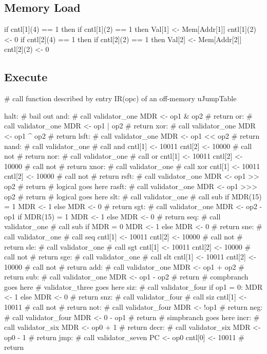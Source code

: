 \documentclass[12pt]{article}
\begin{document}
\subsection{Memory Load}
\begin{verbatimtab}
if cntl[1](4) == 1 then
    if cntl[1](2) == 1 then
        Val[1] <- Mem[Addr[1]]
        cntl[1](2) <- 0
if cntl[2](4) == 1 then
    if cntl[2](2) == 1 then
        Val[2] <- Mem[Addr[2]]
        cntl[2](2) <- 0
\end{verbatimtab}

\subsection{Execute}
\begin{verbatimtab}
# call function described by entry IR(opc) of an off-memory uJumpTable

halt:
# bail out
and:
    # call validator_one
    MDR <- op1 & op2
    # return
or:
    # call validator_one
    MDR <- op1 | op2
    # return
xor:
    # call validator_one
    MDR <- op1 ^ op2
    # return
lsft:
    # call validator_one
    MDR <- op1 << op2
    # return
nand:
    # call validator_one
    # call and
    cntl[1] <- 10011
    cntl[2] <- 10000
    # call not
    # return
nor:
    # call validator_one
    # call or
    cntl[1] <- 10011
    cntl[2] <- 10000
    # call not
    # return
xnor:
    # call validator_one
    # call xor
    cntl[1] <- 10011
    cntl[2] <- 10000
    # call not
    # return
rsft:
    # call validator_one
    MDR <- op1 >> op2
    # return
# logical goes here
rasft:
    # call validator_one
    MDR <- op1 >>> op2
    # return
# logical goes here
slt:
    # call validator_one
    # call sub
    if MDR(15) = 1
        MDR <- 1
    else
        MDR <- 0
    # return
sgt:
    # call validator_one
    MDR <- op2 - op1
    if MDR(15) = 1
        MDR <- 1
    else
        MDR <- 0
    # return
seq:
    # call validator_one
    # call sub
    if MDR = 0
        MDR <- 1
    else
        MDR <- 0
    # return
sne:
    # call validator_one
    # call seq
    cntl[1] <- 10011
    cntl[2] <- 10000
    # call not
    # return
sle:
    # call validator_one
    # call sgt
    cntl[1] <- 10011
    cntl[2] <- 10000
    # call not
    # return
sge:
    # call validator_one
    # call slt
    cntl[1] <- 10011
    cntl[2] <- 10000
    # call not
    # return
add:
    # call validator_one
    MDR <- op1 + op2
    # return
sub:
    # call validator_one
    MDR <- op1 - op2
    # return
# compbranch goes here
# validator_three goes here
siz:
    # call validator_four
    if op1 = 0:
       MDR <- 1
    else
       MDR <- 0
    # return
snz:
    # call validator_four
    # call siz
    cntl[1] <- 10011 
    # call not
    # return
not:
    # call validator_four
    MDR <- !op1
    # return
neg:
    # call validator_four
    MDR <- 0 - op1
    # return
# simpbranch goes here
incr:
	# call validator_six
	MDR <- op0 + 1
	# return
decr:
	# call validator_six
	MDR <- op0 - 1
	# return
jmp:
    # call validator_seven
    PC <- op0
    cntl[0] <- 10011
    # return


\end{verbatimtab}
\end{document}
